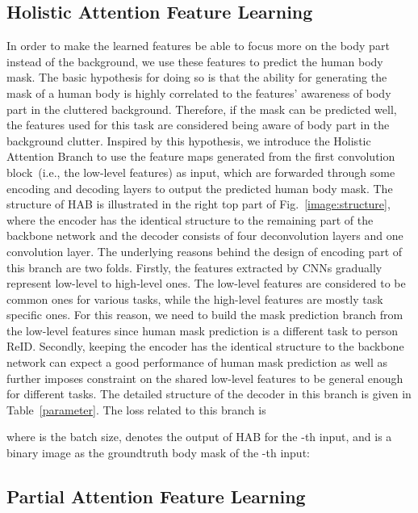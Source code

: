 \documentclass[10pt,twocolumn,letterpaper]{article}
\begin{document}
\subsection{Holistic Attention Feature Learning}
In order to make the learned features be able to focus more on the body part instead of the background, we use these features to predict the human body mask. The basic hypothesis for doing so is that the ability for generating the mask of a human body is highly correlated to the features' awareness of body part in the cluttered background. Therefore, if the mask can be predicted well, the features used for this task are considered being aware of body part in the background clutter. Inspired by this hypothesis, we introduce the Holistic Attention Branch to use the feature maps generated from the first convolution block~(i.e., the low-level features) as input, which are forwarded through some encoding and decoding layers to output the predicted human body mask. The structure of HAB is illustrated in the right top part of Fig.~\ref{image:structure}, where the encoder has the identical structure to the remaining part of the backbone network and the decoder consists of four deconvolution layers\cite{zeiler2010deconvolutional} and one  convolution layer. The underlying reasons behind the design of encoding part of this branch are two folds. Firstly, the features extracted by CNNs gradually represent low-level to high-level ones. The low-level features are considered to be common ones for various tasks, while the high-level features are mostly task specific ones. For this reason, we need to build the mask prediction branch from the low-level features since human mask prediction is a different task to person ReID. Secondly, keeping the encoder has the identical structure to the backbone network can expect a good performance of human mask prediction as well as further imposes constraint on the shared low-level features to be general enough for different tasks. The detailed structure of the decoder in this branch is given in Table~\ref{parameter}. The loss  related to this branch is

where  is the batch size,  denotes the output of HAB for the -th input, and  is a binary image as the groundtruth body mask of the -th input:



\subsection{Partial Attention Feature Learning}
\label{PAB}
\end{document}
